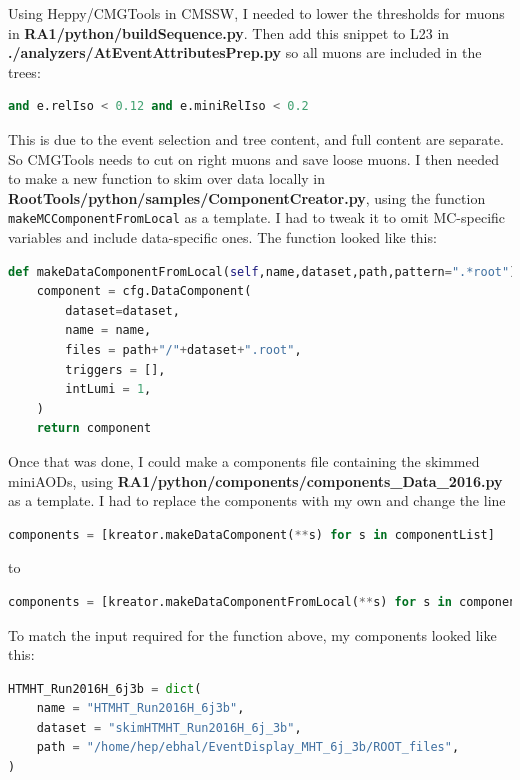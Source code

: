 Using Heppy/CMGTools in CMSSW, I needed to lower the thresholds for muons in \textbf{RA1/python/buildSequence.py}. Then add this snippet to L23 in \textbf{./analyzers/AtEventAttributesPrep.py} so all muons are included in the trees:

\begin{lstlisting}[belowskip=-0.7cm, language=python, numbers=none]
and e.relIso < 0.12 and e.miniRelIso < 0.2
\end{lstlisting}

This is due to the event selection and tree content, and full content are separate. So CMGTools needs to cut on right muons and save loose muons. I then needed to make a new function to skim over data locally in \textbf{RootTools/python/samples/ComponentCreator.py}, using the function \texttt{makeMCComponentFromLocal} as a template. I had to tweak it to omit MC-specific variables and include data-specific ones. The function looked like this:

\begin{lstlisting}[belowskip=-0.7cm, language=python, numbers=none]
def makeDataComponentFromLocal(self,name,dataset,path,pattern=".*root"):
    component = cfg.DataComponent(
        dataset=dataset,
        name = name,
        files = path+"/"+dataset+".root",
        triggers = [],
        intLumi = 1,
    )
    return component
\end{lstlisting}

Once that was done, I could make a components file containing the skimmed miniAODs, using \textbf{RA1/python/components/components\_Data\_2016.py} as a template. I had to replace the components with my own and change the line

\begin{lstlisting}[belowskip=-0.7cm, language=python, numbers=none]
components = [kreator.makeDataComponent(**s) for s in componentList]
\end{lstlisting}

to

\begin{lstlisting}[belowskip=-0.7cm, language=python, numbers=none]
components = [kreator.makeDataComponentFromLocal(**s) for s in componentList]
\end{lstlisting}

To match the input required for the function above, my components looked like this:

\begin{lstlisting}[belowskip=-0.7cm, language=python, numbers=none]
HTMHT_Run2016H_6j3b = dict(
    name = "HTMHT_Run2016H_6j3b",
    dataset = "skimHTMHT_Run2016H_6j_3b",
    path = "/home/hep/ebhal/EventDisplay_MHT_6j_3b/ROOT_files",                                                                                                                                 
)
\end{lstlisting}

